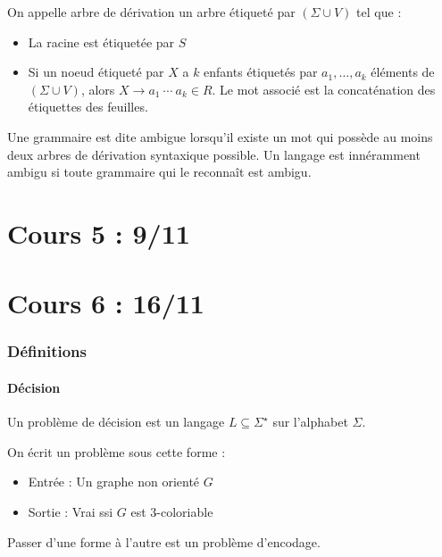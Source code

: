 \documentclass{cours}
\begin{document}
\begin{definition}
    On appelle arbre de dérivation un arbre étiqueté par $\left(\Sigma \cup V\right)$ tel que : 
    \begin{itemize}
        \item La racine est étiquetée par $S$
        \item Si un noeud étiqueté par $X$ a $k$ enfants étiquetés par $a_{1}, \ldots, a_{k}$ éléments de $\left(\Sigma \cup V\right)$, alors $X \rightarrow a_{1}\ \cdots \ a_{k} \in R$. Le mot associé est la concaténation des étiquettes des feuilles. 
    \end{itemize}
    
    Une grammaire est dite ambigue lorsqu'il existe un mot qui possède au moins deux arbres de dérivation syntaxique possible. Un langage est innéramment ambigu si toute grammaire qui le reconnaît est ambigu. 
\end{definition}

\part[Automates à Pile]{Cours 5 : 9/11}



\part[Machines de Turing]{Cours 6 : 16/11}
\section{Définitions}
\subsection{Décision}
\begin{definition}
    Un problème de décision est un langage $L \subseteq \Sigma^{\star}$ sur l'alphabet $\Sigma$.
\end{definition}
\begin{example} 
    On écrit un problème sous cette forme : 
    \begin{itemize}
        \item Entrée : Un graphe non orienté $G$
        \item Sortie : Vrai ssi $G$ est $3$-coloriable
    \end{itemize}
    Passer d'une forme à l'autre est un problème d'encodage.
\end{example}
\end{document}
